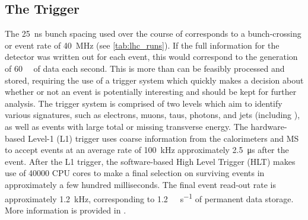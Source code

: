 \subsection{The Trigger}\label{sec:trigger}
The \SI{25}{\nano\second} bunch spacing used over the course of \runtwo corresponds to a bunch-crossing or event rate of \SI{40}{\mega\hertz} (see \cref{tab:lhc_runs}).
If the full information for the detector was written out for each event, this would correspond to the generation of \SI{60}{\tera\byte} of data each second.
This is more than can be feasibly processed and stored, requiring the use of a trigger system which quickly makes a decision about whether or not an event is potentially interesting and should be kept for further analysis.
The trigger system is comprised of two levels which aim to identify various signatures, such as electrons, muons, taus, photons, and jets (including \bjets), as well as events with large total or missing transverse energy.
The hardware-based Level-1 (L1) trigger uses coarse information from the calorimeters and MS to accept events at an average rate of \SI{100}{\kilo\hertz} approximately \SI{2.5}{\micro\second} after the event.
After the L1 trigger, the software-based High Level Trigger (HLT) makes use of \num{40000} CPU cores to make a final selection on surviving events in approximately a few hundred milliseconds. 
The final event read-out rate is approximately \SI{1.2}{\kilo\hertz}, corresponding to \SI{1.2}{\giga\byte\per\second} of permanent data storage.
More information is provided in \cite{TRIG-2016-01}.


